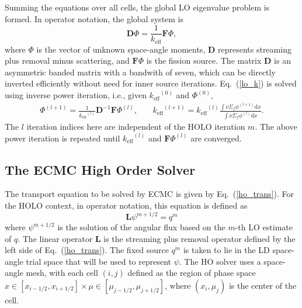 \documentclass[10pt,twocolumn,pdftex,superscriptaddress]{anstrans}
\renewcommand{\eqref}[1]{(\ref{#1})}
\newcommand{\B}[1]{\ensuremath{\mathbf{#1}}}
\renewcommand{\d}{\mathrm{d}}
\newcommand{\keff}{\ensuremath{k_{\text{eff}}}}
\newcommand{\sig}[1]{\ensuremath{\Sigma_{#1}}}
\begin{document}
Summing the equations over all cells, the global LO eigenvalue problem is formed.  In
operator notation, the global system is 
\begin{equation}\label{lo_k}
    \B D \Phi = \frac{1}{\keff} \B F \Phi,
\end{equation}
where $\Phi$ is the vector of unknown space-angle moments, $\B D$ represents
streaming plus removal minus scattering, and $\B F \Phi$ is the
fission source.  The matrix $\B D$ is an asymmetric banded matrix with a bandwith of
seven, which can
be directly inverted efficiently
without need for inner source iterations.  Eq.~\eqref{lo_k} is solved using inverse
power iteration, i.e., given $\keff^{(0)}$ and $\Phi^{(0)}$,
\begin{align*}
    \Phi^{(l+1)} = \frac{1}{\keff^{(l)}} \B D^{-1} \B F \Phi^{(l)}, &
    \quad \keff^{(l+1)} = \keff^{(l)}\frac{ \int \nu \sig f \phi^{(l+1)} \d
    x}{ \int \nu \sig f \phi^{(l)}\d x }.
\end{align*}
The $l$ iteration indices here are independent of the HOLO iteration $m$.
The above power iteration is repeated until $\keff^{(l)}$ and $\B F \Phi^{(l)}$ are
converged.  


\subsection*{The ECMC High Order Solver}

The transport equation to be solved by ECMC is given by Eq.~\eqref{ho_trans}. 
For the HOLO context, in operator notation, this equation is defined as
\begin{equation}\label{te_oper}
\B L \psi^{m+1/2}  = q^{m}
\end{equation}
where $\psi^{m+1/2}$ is the solution of the angular flux based on the $m$-th
LO estimate of $q$.  The linear operator $\B L$ is the streaming plus
removal operator defined by the left
side of Eq.~\eqref{ho_trans}.  The fixed
source $q^{m}$ is taken to lie in the LD space-angle trial space that will be used to represent
$\psi$.  The HO solver uses a space-angle mesh, with each cell $(i,j)$
defined as the region of phase space $x \in [x_{i-1/2},x_{i+1/2}] \times \mu \in
[\mu_{j-1/2}, \mu_{j+1/2}]$, where $(x_i,\mu_j)$ is the center of the cell.
\end{document}
